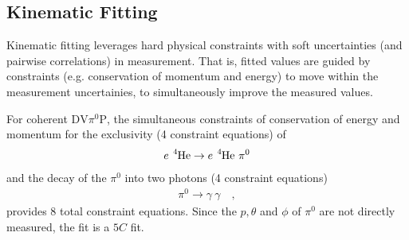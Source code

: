 \documentclass[10pt,prd,aps,showpacs,twocolumn,unsortedaddress]{revtex4-1}
\newcommand\he{{\ce{^{4}He}}}
\newcommand\pio{{\pi^0}}
\newcommand\dvmp{{\text{DV}\pio\text{P}}}
\newcommand\coherent{e ~\he \rightarrow e ~\he ~\pio }
\newcommand\decay{\pio \rightarrow \gamma ~\gamma }
\begin{document}
\subsection{Kinematic Fitting}
Kinematic fitting leverages hard physical constraints with soft uncertainties (and pairwise correlations) in measurement. That is, fitted values are guided by constraints (e.g. conservation of momentum and energy) to move within the measurement uncertainies, to simultaneously improve the measured values. 

For coherent $\dvmp$, the simultaneous constraints of conservation of energy and momentum for the exclusivity (4 constraint equations) of 
\begin{align*}
  \coherent 
\end{align*}
and the decay of the $\pio$ into two photons (4 constraint equations)
\begin{align*}
  \decay  \quad,
\end{align*}
provides 8 total constraint equations. 
Since the $p, \theta$ and $\phi$ of $\pio$ are not directly measured, the fit is a $5C$ fit.
\end{document}
